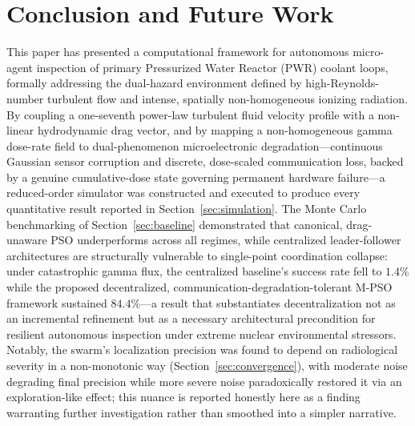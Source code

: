 \documentclass[journal]{IEEEtran}
\begin{document}
\section{Conclusion and Future Work}
\label{sec:conclusion}

This paper has presented a computational framework for autonomous micro-agent inspection of primary Pressurized Water Reactor (PWR) coolant loops, formally addressing the dual-hazard environment defined by high-Reynolds-number turbulent flow and intense, spatially non-homogeneous ionizing radiation. By coupling a one-seventh power-law turbulent fluid velocity profile with a non-linear hydrodynamic drag vector, and by mapping a non-homogeneous gamma dose-rate field to dual-phenomenon microelectronic degradation---continuous Gaussian sensor corruption and discrete, dose-scaled communication loss, backed by a genuine cumulative-dose state governing permanent hardware failure---a reduced-order simulator was constructed and executed to produce every quantitative result reported in Section~\ref{sec:simulation}. The Monte Carlo benchmarking of Section~\ref{sec:baseline} demonstrated that canonical, drag-unaware PSO underperforms across all regimes, while centralized leader-follower architectures are structurally vulnerable to single-point coordination collapse: under catastrophic gamma flux, the centralized baseline's success rate fell to $1.4\%$ while the proposed decentralized, communication-degradation-tolerant M-PSO framework sustained $84.4\%$---a result that substantiates decentralization not as an incremental refinement but as a necessary architectural precondition for resilient autonomous inspection under extreme nuclear environmental stressors. Notably, the swarm's localization precision was found to depend on radiological severity in a non-monotonic way (Section~\ref{sec:convergence}), with moderate noise degrading final precision while more severe noise paradoxically restored it via an exploration-like effect; this nuance is reported honestly here as a finding warranting further investigation rather than smoothed into a simpler narrative.
\end{document}
